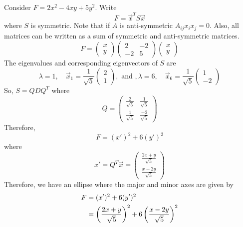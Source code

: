 \documentclass{article}
\numberwithin{equation}{section}
\begin{document}
\begin{eg}
    Consider $F = 2x^2 - 4xy + 5y^2$. 
    Write 
    \[
        F = \vec x^T S \vec x
    \] 
    where $S$ is symmetric.
    Note that if $A$ is anti-symmetric $A_{ij}x_ix_j = 0$. Also, all matrices can be written as a sum of symmetric and anti-symmetric matrices.
    \[
        F = \begin{pmatrix}
            x \\ y
        \end{pmatrix}
        \begin{pmatrix}
            2 & -2 \\
            -2 & 5
        \end{pmatrix}
        \begin{pmatrix}
            x \\ y
        \end{pmatrix}
    \]
    The eigenvalues and corresponding eigenvectors of $S$ are
    \[
        \lambda = 1, \quad \vec x_{1} = \frac{1}{\sqrt{5}}\begin{pmatrix}
            2 \\ 1
        \end{pmatrix}, \text{  and  },
        \lambda = 6, \quad \vec x_{6} = \frac{1}{\sqrt{5}}\begin{pmatrix}
            1 \\ -2
        \end{pmatrix}
    \]
    So, $S = Q D Q^T$ where 
    \[
        Q = \begin{pmatrix}
            \frac{2}{\sqrt{5}} & \frac{1}{\sqrt{5}} \\
            \frac{1}{\sqrt{5}} & \frac{-2}{\sqrt{5}}
        \end{pmatrix}
    \]
    Therefore,
    \[
        F = (x')^2 + 6(y')^2
    \]
    where
    \[
        x' = Q^T \vec x = \begin{pmatrix}
            \frac{2x + y}{\sqrt{5}} \\
            \frac{x - 2y}{\sqrt{5}}
        \end{pmatrix}
    \]
    Therefore, we have an ellipse where the major and minor axes are given by
    \begin{align*}
        F &= (x')^2 + 6(y')^2 \\
        &= \left( \frac{2x + y}{\sqrt{5}} \right)^2 + 6 \left( \frac{x - 2y}{\sqrt{5}} \right)^2
    \end{align*}
\end{eg}
\end{document}
